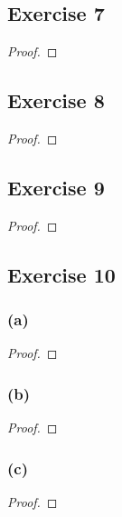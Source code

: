 \documentclass[14pt]{extarticle}
\begin{document}
\subsection{Exercise 7}

\begin{proof}

\end{proof}

\subsection{Exercise 8}

\begin{proof}

\end{proof}

\subsection{Exercise 9}

\begin{proof}

\end{proof}

\subsection{Exercise 10}

\subsubsection{(a)}

\begin{proof}

\end{proof}

\subsubsection{(b)}

\begin{proof}

\end{proof}

\subsubsection{(c)}

\begin{proof}

\end{proof}
\end{document}
